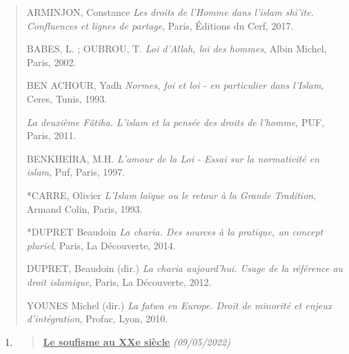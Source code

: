 \begin{quote}
ARMINJON, Constance \emph{Les droits de l'Homme dans l'islam shi'ite.
Confluences et lignes de partage}, Paris, Éditions du Cerf, 2017.

BABES, L. ; OUBROU, T. \emph{Loi d'Allah, loi des hommes}, Albin Michel,
Paris, 2002.

BEN ACHOUR, Yadh \emph{Normes, foi et loi - en particulier dans
l'Islam}, Ceres, Tunis, 1993.

\emph{La deuxième Fâtiha. L'islam et la pensée des droits de l'homme},
PUF, Paris, 2011.

BENKHEIRA, M.H. \emph{L'amour de la Loi - Essai sur la normativité en
islam}, Puf, Paris, 1997.

*CARRE, Olivier \emph{L'Islam laïque ou le retour à la Grande
Tradition}, Armand Colin, Paris, 1993.

*DUPRET Beaudoin \emph{La charia. Des sources à la pratique, un concept
pluriel}, Paris, La Découverte, 2014.

DUPRET, Beaudoin (dir.) \emph{La charia aujourd'hui. Usage de la
référence au droit islamique}, Paris, La Découverte, 2012.

YOUNES Michel (dir.) \emph{La fatwa en Europe. Droit de minorité et
enjeux d'intégration}, Profac, Lyon, 2010.
\end{quote}

\begin{enumerate}
\def\labelenumi{\arabic{enumi}.}
\setcounter{enumi}{2}
\item
  \begin{quote}
  \textbf{\underline{Le soufisme au XXe siècle}} \emph{(09/05/2022)}
  \end{quote}
\end{enumerate}

